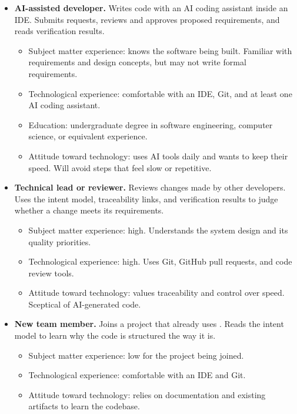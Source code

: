 \documentclass[12pt]{article}
\begin{document}
\begin{itemize}
  \item \textbf{AI-assisted developer.} Writes code with an AI coding assistant
  inside an IDE. Submits requests, reviews and approves proposed requirements,
  and reads verification results.
  \begin{itemize}
    \item Subject matter experience: knows the software being built.
    Familiar with requirements and design concepts, but may not write formal
    requirements.
    \item Technological experience: comfortable with an IDE, Git, and at least
    one AI coding assistant.
    \item Education: undergraduate degree in software engineering, computer
    science, or equivalent experience.
    \item Attitude toward technology: uses AI tools daily and wants to keep
    their speed. Will avoid steps that feel slow or repetitive.
  \end{itemize}

  \item \textbf{Technical lead or reviewer.} Reviews changes made by other
  developers. Uses the intent model, traceability links, and verification
  results to judge whether a change meets its requirements.
  \begin{itemize}
    \item Subject matter experience: high. Understands the system design and
    its quality priorities.
    \item Technological experience: high. Uses Git, GitHub pull requests, and
    code review tools.
    \item Attitude toward technology: values traceability and control over
    speed. Sceptical of AI-generated code.
  \end{itemize}

  \item \textbf{New team member.} Joins a project that already uses
  \progname{}. Reads the intent model to learn why the code is structured the
  way it is.
  \begin{itemize}
    \item Subject matter experience: low for the project being joined.
    \item Technological experience: comfortable with an IDE and Git.
    \item Attitude toward technology: relies on documentation and existing
    artifacts to learn the codebase.
  \end{itemize}
\end{itemize}
\end{document}
